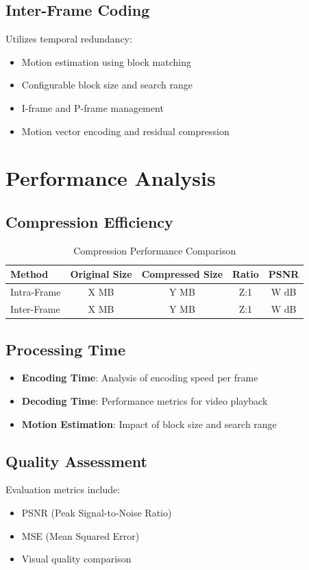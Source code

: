 \documentclass[a4paper,14pt]{article}
\begin{document}
\subsection{Inter-Frame Coding}
Utilizes temporal redundancy:
\begin{itemize}
    \item Motion estimation using block matching
    \item Configurable block size and search range
    \item I-frame and P-frame management
    \item Motion vector encoding and residual compression
\end{itemize}

\section{Performance Analysis}

\subsection{Compression Efficiency}
\begin{table}[h]
\centering
\begin{tabular}{|l|c|c|c|c|}
\hline
\textbf{Method} & \textbf{Original Size} & \textbf{Compressed Size} & \textbf{Ratio} & \textbf{PSNR} \\
\hline
Intra-Frame & X MB & Y MB & Z:1 & W dB \\
Inter-Frame & X MB & Y MB & Z:1 & W dB \\
\hline
\end{tabular}
\caption{Compression Performance Comparison}
\end{table}

\subsection{Processing Time}
\begin{itemize}
    \item \textbf{Encoding Time}: Analysis of encoding speed per frame
    \item \textbf{Decoding Time}: Performance metrics for video playback
    \item \textbf{Motion Estimation}: Impact of block size and search range
\end{itemize}

\subsection{Quality Assessment}
Evaluation metrics include:
\begin{itemize}
    \item PSNR (Peak Signal-to-Noise Ratio)
    \item MSE (Mean Squared Error)
    \item Visual quality comparison
\end{itemize}
\end{document}
